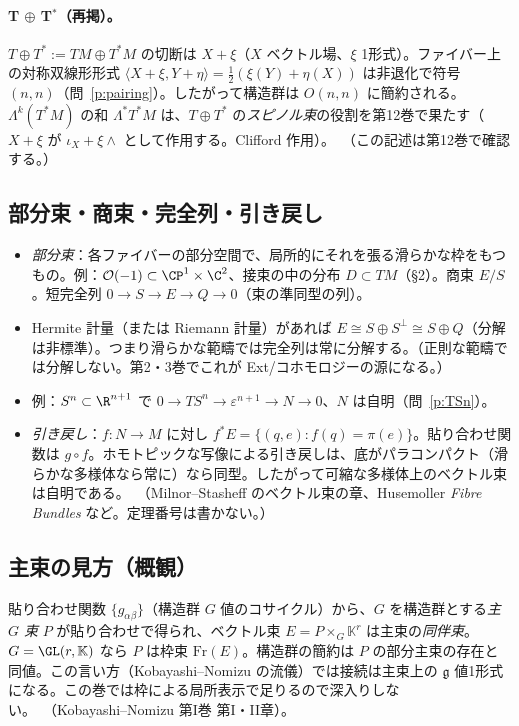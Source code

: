 \paragraph{T $\oplus$ T$^*$（再掲）。}$T\oplus T^*:=TM\oplus T^*M$ の切断は $X+\xi$（$X$ ベクトル場、$\xi$ 1形式）。ファイバー上の対称双線形形式 $\langle X+\xi,Y+\eta\rangle=\frac12(\xi(Y)+\eta(X))$ は非退化で符号 $(n,n)$（問~\ref{p:pairing}）。したがって構造群は $O(n,n)$ に簡約される。
$\Lambda^k(T^*M)$ の和 $\Lambda^*T^*M$ は、$T\oplus T^*$ の\emph{スピノル束}の役割を第12巻で果たす（$X+\xi$ が $\iota_X+\xi\wedge$ として作用する。Clifford 作用）。\tQ\ （この記述は第12巻で確認する。）


\subsection{部分束・商束・完全列・引き戻し}
\begin{itemize}
\item \emph{部分束}：各ファイバーの部分空間で、局所的にそれを張る滑らかな枠をもつもの。例：$\mathcal O(-1)\subset\CP^1\times\C^2$、接束の中の分布 $D\subset TM$（§2）。商束 $E/S$。短完全列 $0\to S\to E\to Q\to0$（束の準同型の列）。
\item Hermite 計量（または Riemann 計量）があれば $E\cong S\oplus S^\perp\cong S\oplus Q$（分解は非標準）。つまり滑らかな範疇では完全列は常に分解する。（正則な範疇では分解しない。第2・3巻でこれが Ext/コホモロジーの源になる。）
\item 例：$S^n\subset\R^{n+1}$ で $0\to TS^n\to\varepsilon^{n+1}\to N\to0$、$N$ は自明（問~\ref{p:TSn}）。
\item \emph{引き戻し}：$f:N\to M$ に対し $f^*E=\{(q,e):f(q)=\pi(e)\}$。貼り合わせ関数は $g\circ f$。ホモトピックな写像による引き戻しは、底がパラコンパクト（滑らかな多様体なら常に）なら同型。したがって可縮な多様体上のベクトル束は自明である。\tC\ （Milnor--Stasheff のベクトル束の章、Husemoller \emph{Fibre Bundles} など。定理番号は書かない。）
\end{itemize}

\subsection{主束の見方（概観）}
貼り合わせ関数 $\{g_{\alpha\beta}\}$（構造群 $G$ 値のコサイクル）から、$G$ を構造群とする\emph{主 $G$ 束} $P$ が貼り合わせで得られ、ベクトル束 $E=P\times_G\mathbb K^r$ は主束の\emph{同伴束}。$G=\GL(r,\mathbb K)$ なら $P$ は枠束 $\mathrm{Fr}(E)$。構造群の簡約は $P$ の部分主束の存在と同値。この言い方（Kobayashi--Nomizu の流儀）では接続は主束上の $\mathfrak g$ 値1形式になる。この巻では枠による局所表示で足りるので深入りしない。\tC\ （Kobayashi--Nomizu 第I巻 第I・II章）。

